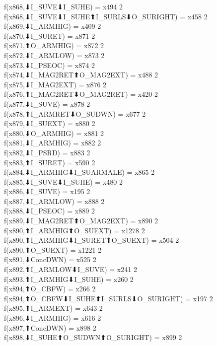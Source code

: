 f(x868,⬇I_SUVE⬇I_SUHE) = x494 {2} \\
f(x868,⬇I_SUVE⬇I_SUHE⬆I_SURLS⬇O_SURIGHT) = x458 {2} \\
f(x869,⬇I_ARMHIG) = x409 {2} \\
f(x870,⬇I_SURET) = x871 {2} \\
f(x871,⬆O_ARMHIG) = x872 {2} \\
f(x872,⬇I_ARMLOW) = x873 {2} \\
f(x873,⬇I_PSEOC) = x874 {2} \\
f(x874,⬇I_MAG2RET⬆O_MAG2EXT) = x488 {2} \\
f(x875,⬇I_MAG2EXT) = x876 {2} \\
f(x876,⬆I_MAG2RET⬇O_MAG2RET) = x420 {2} \\
f(x877,⬇I_SUVE) = x878 {2} \\
f(x878,⬆I_ARMRET⬇O_SUDWN) = x677 {2} \\
f(x879,⬇I_SUEXT) = x880 {2} \\
f(x880,⬇O_ARMHIG) = x881 {2} \\
f(x881,⬇I_ARMHIG) = x882 {2} \\
f(x882,⬇I_PSRD) = x883 {2} \\
f(x883,⬆I_SURET) = x590 {2} \\
f(x884,⬇I_ARMHIG⬇I_SUARMALE) = x865 {2} \\
f(x885,⬇I_SUVE⬇I_SUHE) = x480 {2} \\
f(x886,⬇I_SUVE) = x195 {2} \\
f(x887,⬇I_ARMLOW) = x888 {2} \\
f(x888,⬇I_PSEOC) = x889 {2} \\
f(x889,⬇I_MAG2RET⬆O_MAG2EXT) = x890 {2} \\
f(x890,⬆I_ARMHIG⬆O_SUEXT) = x1278 {2} \\
f(x890,⬆I_ARMHIG⬇I_SURET⬆O_SUEXT) = x504 {2} \\
f(x890,⬆O_SUEXT) = x1221 {2} \\
f(x891,⬇ConcDWN) = x525 {2} \\
f(x892,⬆I_ARMLOW⬇I_SUVE) = x241 {2} \\
f(x893,⬆I_ARMHIG⬇I_SUHE) = x260 {2} \\
f(x894,⬆O_CBFW) = x266 {2} \\
f(x894,⬆O_CBFW⬇I_SUHE⬆I_SURLS⬇O_SURIGHT) = x197 {2} \\
f(x895,⬆I_ARMEXT) = x643 {2} \\
f(x896,⬇I_ARMHIG) = x616 {2} \\
f(x897,⬆ConcDWN) = x898 {2} \\
f(x898,⬇I_SUHE⬆O_SUDWN⬆O_SURIGHT) = x899 {2} \\
